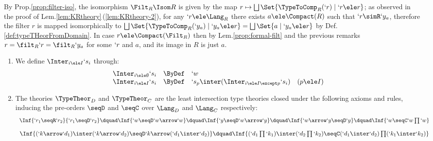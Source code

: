 \documentclass{lmcs}
\begin{document}
 \begin{rem} \label{rem:Filt_R}
By Prop.\skp\ref{prop:filter-iso}, the isomorphism $\Filt_R \Isom R$ is given by the map $r \mapsto \bigsqcup \Set{\TypeToComp_R(`r) \mid `r \ele r}$; as observed in the proof of Lem.\skp\ref{lem:KRtheory}\,(\ref{lem:KRtheory-2}), for any $`r\ele \Lang_R$ there exists $a\ele \Compact(R)$ such that $`r \simR `y_a$, therefore the filter $r$ is mapped isomorphically to $\bigsqcup \Set{\TypeToComp_R(`y_a) \mid `y_a \ele r} = \bigsqcup \Set{a \mid `y_a \ele r}$ by Def.\skp\ref{def:typeTHeorFromDomain}. 
In case $r \ele \Compact(\Filt_R)$ then by Lem.\skp\ref{prop:formal-filt} and the previous remarks $r = \filt_R`r = \filt_R`y_a$ for some $`r$ and $a$, and its image in $R$ is just $a$. 
 \end{rem}

 \begin{defi}  \label{def:typeTheories}

 \begin{enumerate}

 \firstitem
$\Lang_D$ and $\Lang_C$ are the intersection type languages defined by the grammar:
%
 \[ \begin{array}{r@{\quad}rcll} 
 \Lang_D: & `d & :: =& `r \mid `k\arrow `r \mid `w \mid `d\inter `d & (`r \ele \Lang_R) \\
 \Lang_C: & `k & :: =& `d\prod `k \mid `w \mid `k \inter `k 
 \end{array} \]
We let $`d$ range over $\Lang_D$, and $`k$ over $\Lang_C$, and $`s,`t$ over $\Lang_D \union \Lang_C$.

 \item
We define $\Inter_{i \ele I}`s_i$ through:
%
 \[ \begin{array}{rcl@{\quad}l}
\Inter_{i \ele \emptyset}`s_i &\ByDef& `w \\
\Inter_{i \ele I}`s_i &\ByDef& `s_p \inter (\Inter_{i \ele I\except p}`s_i) & (p \ele I) 
 \end{array} \]

 \item
The theories $\TypeTheor_D$ and $ \TypeTheor_C$ are the least intersection type theories closed under the following axioms and rules, inducing the pre-orders $\seqD$ and $ \seqC $ over $\Lang_D$ and $\Lang_C$ respectively: 
%
 \[ \begin{array}{c@{\dquad}c@{\dquad}c@{\dquad}c@{\dquad}c}
\Inf	{ `r_1 \seqR `r_2 }
	{ `r_1 \seqD `r_2 }
	&
\Inf	{ `w \seqD `w\arrow `w }
	&
\Inf	{ `y \seqD `w\arrow `y }
	&
\Inf	{ `w\arrow `y \seqD `y }
	&
\Inf	{ `w \seqC `w\prod `w }
 \end{array} \]
%
 \[ \begin{array}{c@{\dquad}c}
\Inf	{(`k\arrow `d_1) \inter (`k\arrow `d_2) \seqD `k\arrow(`d_1 \inter`d_2) }
	&
\Inf {(`d_1\prod `k_1) \inter (`d_2\prod `k_2) \seqC (`d_1 \inter `d_2)\prod (`k_1 \inter `k_2)}
 \end{array} \]


\end{enumerate}
\end{defi}
\end{document}
